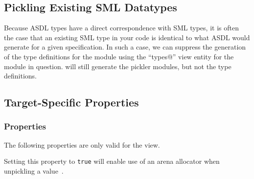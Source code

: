 \subsection{Pickling Existing SML Datatypes}

Because ASDL types have a direct correspondence with SML types, it is often
the case that an existing SML type in your code is identical to what
ASDL would generate for a given specification.
In such a case, we can suppress the generation of the type definitions
for the module using the ``\lstinline@suppress types@'' view entity
for the module in question.
\asdlgen{} will still generate the pickler modules, but not the type
definitions.

\subsection{Target-Specific Properties}

\subsubsection{\Cplusplus{} Properties}
The following properties are only valid for the \Cplusplus{} view.
\begin{description}
    Setting this property to \texttt{true} will enable use of an arena allocator
    when unpickling a value~\cite{arena-alloc}.
\end{description}%

